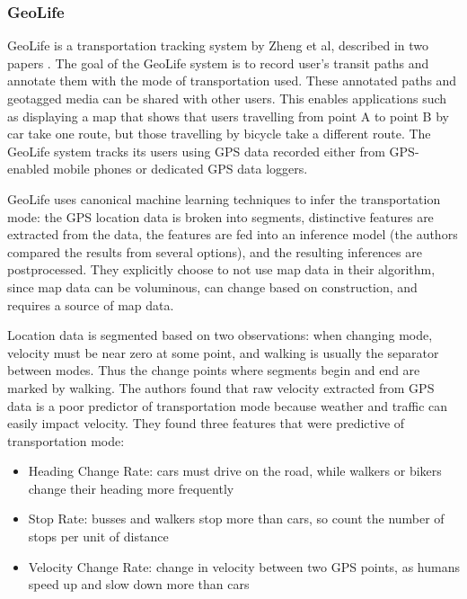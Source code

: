 \subsubsection{GeoLife}

GeoLife is a transportation tracking system by Zheng et al, described in two papers \cite{zheng-learning-mode-2008, Zheng2008Understanding-mobility}. The goal of the GeoLife system is to record user's transit paths and annotate them with the mode of transportation used. These annotated paths and geotagged media can be shared with other users. This enables applications such as displaying a map that shows that users travelling from point A to point B by car take one route, but those travelling by bicycle take a different route. The GeoLife system tracks its users using GPS data recorded either from GPS-enabled mobile phones or dedicated GPS data loggers.

GeoLife uses canonical machine learning techniques to infer the transportation mode: the GPS location data is broken into segments, distinctive features are extracted from the data, the features are fed into an inference model (the authors compared the results from several options), and the resulting inferences are postprocessed. They explicitly choose to not use map data in their algorithm, since map data can be voluminous, can change based on construction, and requires a source of map data.

Location data is segmented based on two observations: when changing mode, velocity must be near zero at some point, and walking is usually the separator between modes. Thus the change points where segments begin and end are marked by walking. The authors found that raw velocity extracted from GPS data is a poor predictor of transportation mode because weather and traffic can easily impact velocity. They found three features that were predictive of transportation mode:
\begin{itemize}
	\item Heading Change Rate: cars must drive on the road, while walkers or bikers change their heading more frequently
	\item Stop Rate: busses and walkers stop more than cars, so count the number of stops per unit of distance
	\item Velocity Change Rate: change in velocity between two GPS points, as humans speed up and slow down more than cars
\end{itemize}


